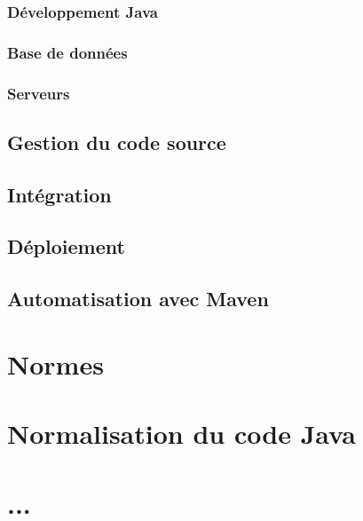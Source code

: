 \documentclass[11pt]{article}
\begin{document}
\subsubsection{Développement Java}

\subsubsection{Base de données}

\subsubsection{Serveurs}

\subsection{Gestion du code source}

\subsection{Intégration}

\subsection{Déploiement}

\subsection{Automatisation avec Maven}

\section{Normes}

\section{Normalisation du code Java}

\section{...}
\end{document}
